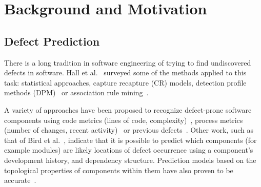 \documentclass[10pt,conference]{IEEEtran}
\theoremstyle{break}
\theoremstyle{break}
\begin{document}

 



 


\section{Background and Motivation}

\subsection{Defect Prediction}
\label{sect:review}

There is a long tradition in software engineering of trying to find undiscovered defects in software. 
Hall et al.~\cite{hall2012systematic} surveyed some of the methods
applied to this task: statistical approaches, capture recapture 
(CR) models, detection profile methods (DPM)~\cite{song2011general} or
association rule mining~\cite{song2006software}. 

A variety of approaches have been proposed to recognize
 defect-prone  software components using code metrics (lines of code, complexity)~\cite{d2010extensive,menzies2007data, nagappan2006mining,shepperd2014researcher,Menzies2010}, process metrics (number of changes, recent activity)~\cite{hassan2009predicting} or previous defects~\cite{kim2007predicting}.
Other work, such as that of 
Bird et al.~\cite{bird2009putting}, indicate that it is possible to predict which components (for example modules) are likely locations of
defect occurrence using a component's development history,
and dependency structure. 
Prediction models based on the topological properties
of components within them have also  proven to be  
accurate~\cite{zimmermann2008predicting}.
\end{document}
